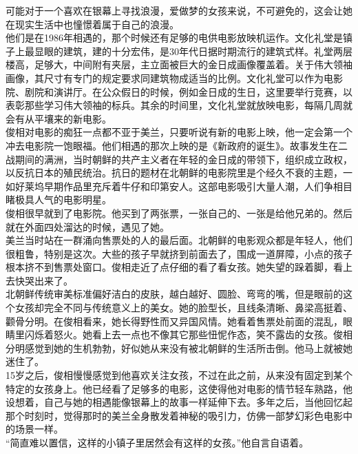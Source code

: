 \begin{multicols}{\theparacolNo}
可能对于一个喜欢在银幕上寻找浪漫，爱做梦的女孩来说，不可避免的，这会让她在现实生活中也憧憬着属于自己的浪漫。\\

他们是在1986年相遇的，那个时候还有足够的电供电影放映机运作。文化礼堂是镇子上最显眼的建筑，建的十分宏伟，是30年代日据时期流行的建筑式样。礼堂两层楼高，足够大，中间附有夹层，主立面被巨大的金日成画像覆盖着。关于伟大领袖画像，其尺寸有专门的规定要求同建筑物成适当的比例。文化礼堂可以作为电影院、剧院和演讲厅。在公众假日的时候，例如金日成的生日，这里要举行竞赛，以表彰那些学习伟大领袖的标兵。其余的时间里，文化礼堂就放映电影，每隔几周就会有从平壤来的新电影。\\

俊相对电影的痴狂一点都不亚于美兰，只要听说有新的电影上映，他一定会第一个冲去电影院一饱眼福。他们相遇的那次上映的是《新政府的诞生》。故事发生在二战期间的满洲，当时朝鲜的共产主义者在年轻的金日成的带领下，组织成立政权，以反抗日本的殖民统治。抗日的题材在北朝鲜的电影院里是个经久不衰的主题，一如好莱坞早期作品里充斥着牛仔和印第安人。这部电影吸引大量人潮，人们争相目睹极具人气的电影明星。\\

俊相很早就到了电影院。他买到了两张票，一张自己的、一张是给他兄弟的。然后就在外面四处溜达的时候，遇见了她。\\

美兰当时站在一群涌向售票处的人的最后面。北朝鲜的电影观众都是年轻人，他们很粗鲁，特别是这次。大些的孩子早就挤到前面去了，围成一道屏障，小点的孩子根本挤不到售票处窗口。俊相走近了点仔细的看了看女孩。她失望的跺着脚，看上去快哭出来了。\\

北朝鲜传统审美标准偏好洁白的皮肤，越白越好、圆脸、弯弯的嘴，但是眼前的这个女孩却完全不同与传统意义上的美女。她的脸型长，且线条清晰、鼻梁高挺着、颧骨分明。在俊相看来，她长得野性而又异国风情。她看着售票处前面的混乱，眼睛里闪烁着怒火。她看上去一点也不像其它那些忸怩作态，笑不露齿的女孩。俊相分明感觉到她的生机勃勃，好似她从来没有被北朝鲜的生活所击倒。他马上就被她迷住了。\\

15岁之后，俊相慢慢感觉到他喜欢关注女孩，不过在此之前，从来没有固定到某个特定的女孩身上。他已经看了足够多的电影，这使得他对电影的情节轻车熟路，他设想着，自己与她的相遇能像银幕上的故事一样延伸下去。多年之后，当他回忆起那个时刻时，觉得那时的美兰全身散发着神秘的吸引力，仿佛一部梦幻彩色电影中的场景一样。\\

“简直难以置信，这样的小镇子里居然会有这样的女孩。”他自言自语着。\\


\end{multicols}
